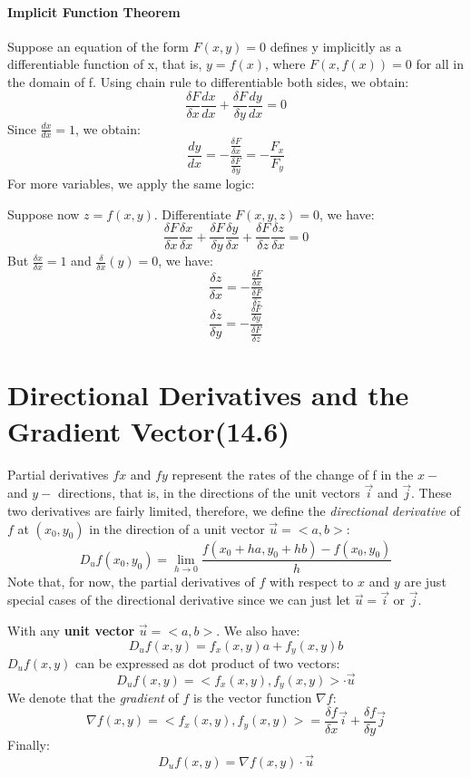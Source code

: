 \documentclass[11pt, oneside]{article}   	%
\begin{document}
\paragraph{Implicit Function Theorem}
Suppose an equation of the form $F(x,y)=0$ defines y implicitly as a differentiable function of x, that is, $y=f(x)$, where $F(x,f(x)) = 0$ for all in the domain of f. Using chain rule to differentiable both sides, we obtain: $$\frac{\delta F}{\delta x}\frac{dx}{dx}+\frac{\delta F}{\delta y}\frac{dy}{dx} = 0$$ Since $\frac{dx}{dx} = 1$, we obtain: $$\frac{dy}{dx} = -\frac{\frac{\delta F}{\delta x}}{\frac{\delta F}{\delta y}} = -\frac{F_x}{F_y}$$
For more variables, we apply the same logic: \par Suppose now $z = f(x,y)$. Differentiate $F(x,y,z)=0$, we have: $$\frac{\delta F}{\delta x}\frac{\delta x}{\delta x}+\frac{\delta F}{\delta y}\frac{\delta y}{\delta x} + \frac{\delta F}{\delta z}\frac{\delta z}{\delta x}= 0$$ But $\frac{\delta x}{\delta x} = 1$ and $\frac{\delta}{\delta x}(y) = 0$, we have:
$$\frac{\delta z}{\delta x} = -\frac{\frac{\delta F}{\delta x}}{\frac{\delta F}{\delta z}}$$
$$\frac{\delta z}{\delta y} = -\frac{\frac{\delta F}{\delta y}}{\frac{\delta F}{\delta z}}$$
\section{Directional Derivatives and the Gradient Vector(14.6)}
Partial derivatives $fx$ and $fy$ represent the rates of the change of f in the $x-$ and $y-$ directions, that is, in the directions of the unit vectors $\vec{i}$ and $\vec{j}$. These two derivatives are fairly limited, therefore, we define the \emph{directional derivative} of $f$ at $(x_0,y_0)$ in the direction of a unit vector $\vec{u} = <a,b>$: $$D_uf(x_0,y_0) = \lim_{h\to0}\frac{f(x_0+ha, y_0+hb)-f(x_0,y_0)}{h}$$ Note that, for now, the partial derivatives of $f$ with respect to $x$ and $y$ are just special cases of the directional derivative since we can just let $\vec{u} = \vec{i} \text{ or } \vec{j}$.

\par
With any \textbf{unit vector} $\vec{u} = <a,b>$. We also have: $$D_uf(x,y)=f_x(x,y)a + f_y(x,y)b$$
$D_uf(x,y)$ can be expressed as dot product of two vectors: $$D_uf(x,y) = <f_x(x,y),f_y(x,y)>\cdot \vec{u}$$
We denote that the \emph{gradient} of $f$ is the vector function $\nabla f$: $$\nabla f(x,y) = <f_x(x,y),f_y(x,y)> = \frac{\delta f}{\delta x} \vec{i} + \frac{\delta f}{\delta y}\vec{j}$$
Finally: $$D_uf(x,y)=\nabla f(x,y)\cdot\vec{u}$$
\end{document}
